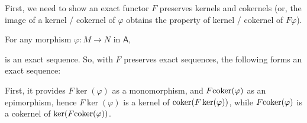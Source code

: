 \documentclass{article}
\newcommand{\cat}[1]{\textsf{#1}}
\newcommand{\coker}{\textmd{coker}}
\newcommand{\Ker}{\textmd{Ker}}
\newcommand{\Cok}{\textmd{Cok}}
\begin{document}
First, we need to show an exact functor $F$ preserves kernels and cokernels (or, the image of a kernel / cokernel of $\varphi$ obtains the property of kernel / cokernel of $F\varphi$).

For any morphism $\varphi:M\rightarrow N$ in $\cat{A}$,  is an exact sequence. So, with $F$ preserves exact sequences, the following forms an exact sequence:
\begin{center}
\end{center}
First, it provides $F\ker(\varphi)$ as a monomorphism, and $F\coker(\varphi)$ as an epimorphism, hence $F\ker(\varphi)$ is a kernel of $\coker(F\ker(\varphi))$, while $F\coker(\varphi)$ is a cokernel of $\ker(F\coker(\varphi))$.
\end{document}
